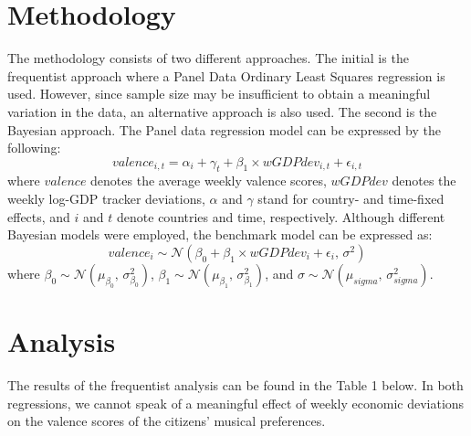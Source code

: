 \documentclass[12pt]{article}
\begin{document}
\section{Methodology}

The methodology consists of two different approaches. The initial is the frequentist approach where a Panel Data Ordinary Least Squares regression is used. However, since sample size may be insufficient to obtain a meaningful variation in the data, an alternative approach is also used. The second is the Bayesian approach. The Panel data regression model can be expressed by the following:
\[
valence_{i,t}=\alpha_i + \gamma_t +\beta_1 \times wGDPdev_{i,t} + \epsilon_{i,t}
\]
where $valence$ denotes the average weekly valence scores, $wGDPdev$ denotes the weekly log-GDP tracker deviations, $\alpha$ and $\gamma$ stand for country- and time-fixed effects, and $i$ and $t$ denote countries and time, respectively.
Although different Bayesian models were employed, the benchmark model can be expressed as:
\[
valence_{i}\sim \mathcal{N}(\beta_0+\beta_1 \times wGDPdev_{i} +\epsilon_{i},\,\sigma^{2})
\]
where $\beta_0 \sim \mathcal{N}(\mu_{\beta_0},\,\sigma^{2}_{\beta_0})$, $\beta_1 \sim \mathcal{N}(\mu_{\beta_1},\,\sigma^{2}_{\beta_1})$, and $\sigma \sim \mathcal{N}(\mu_{sigma},\,\sigma^{2}_{sigma})$.

\section{Analysis}

The results of the frequentist analysis can be found in the Table 1 below. In both regressions, we cannot speak of a meaningful effect of weekly economic deviations on the valence scores of the citizens' musical preferences. 
\end{document}
